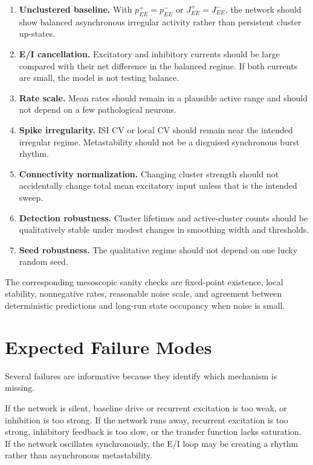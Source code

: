 \begin{enumerate}[leftmargin=*]
  \item \textbf{Unclustered baseline.} With $p_{EE}^{+}=p_{EE}^{-}$ or $J_{EE}^{+}=J_{EE}^{-}$, the network should show balanced asynchronous irregular activity rather than persistent cluster up-states.
  \item \textbf{E/I cancellation.} Excitatory and inhibitory currents should be large compared with their net difference in the balanced regime. If both currents are small, the model is not testing balance.
  \item \textbf{Rate scale.} Mean rates should remain in a plausible active range and should not depend on a few pathological neurons.
  \item \textbf{Spike irregularity.} ISI CV or local CV should remain near the intended irregular regime. Metastability should not be a disguised synchronous burst rhythm.
  \item \textbf{Connectivity normalization.} Changing cluster strength should not accidentally change total mean excitatory input unless that is the intended sweep.
  \item \textbf{Detection robustness.} Cluster lifetimes and active-cluster counts should be qualitatively stable under modest changes in smoothing width and thresholds.
  \item \textbf{Seed robustness.} The qualitative regime should not depend on one lucky random seed.
\end{enumerate}

The corresponding mesoscopic sanity checks are fixed-point existence, local stability, nonnegative rates, reasonable noise scale, and agreement between deterministic predictions and long-run state occupancy when noise is small.

\section{Expected Failure Modes}
\label{sec:baseline-expected-failure-modes}

Several failures are informative because they identify which mechanism is missing.

If the network is silent, baseline drive or recurrent excitation is too weak, or inhibition is too strong. If the network runs away, recurrent excitation is too strong, inhibitory feedback is too slow, or the transfer function lacks saturation. If the network oscillates synchronously, the E/I loop may be creating a rhythm rather than asynchronous metastability.

